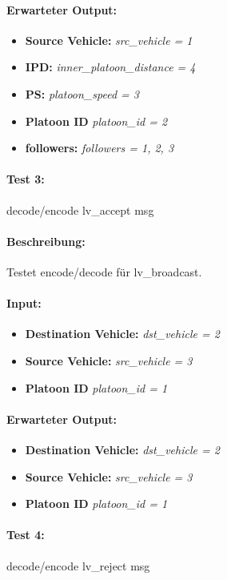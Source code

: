 \documentclass[a4paper, 12pt, titlepage]{scrartcl}
\begin{document}
{			\paragraph{Erwarteter Output:}
			\begin{itemize} \itemsep-0.5em
				\item \textbf{Source Vehicle:} \emph{src\_vehicle = 1}
				\item \textbf{IPD:} \emph{inner\_platoon\_distance = 4}
				\item \textbf{PS:} \emph{platoon\_speed = 3}
				\item \textbf{Platoon ID} \emph{platoon\_id = 2}
				\item \textbf{followers:} \emph{followers = {1, 2, 3}}
			\end{itemize}

			\paragraph{Test 3:}{decode/encode lv\_accept msg}
			\paragraph{Beschreibung:} Testet encode/decode für lv\_broadcast.
			\paragraph{Input:}
			\begin{itemize} \itemsep-0.5em
				\item \textbf{Destination Vehicle:} \emph{dst\_vehicle = 2}
				\item \textbf{Source Vehicle:} \emph{src\_vehicle = 3}
				\item \textbf{Platoon ID} \emph{platoon\_id = 1}
			\end{itemize}
			\paragraph{Erwarteter Output:}
			\begin{itemize} \itemsep-0.5em
				\item \textbf{Destination Vehicle:} \emph{dst\_vehicle = 2}
				\item \textbf{Source Vehicle:} \emph{src\_vehicle = 3}
				\item \textbf{Platoon ID} \emph{platoon\_id = 1}
			\end{itemize}

			\paragraph{Test 4:}{decode/encode lv\_reject msg}
}
\end{document}
